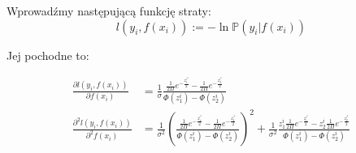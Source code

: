 \documentclass[12pt,a4paper]{article}
\begin{document}
Wprowadźmy następującą funkcję straty:
$$
\textit{l}(y_i, f(x_i)) := -\ln\mathbb{P}(y_i| f(x_i))
$$

Jej pochodne to:

\begin{align*}
\frac{\partial\textit{l}(y_i, f(x_i))}{\partial f(x_i)} 
&= \frac{1}{\sigma}\frac{\frac{1}{2\Pi}e^{-\frac{z_1^{i^2}}{2}}-\frac{1}{2\Pi}e^{-\frac{z_2^{i^2}}{2}}}{\Phi\left( z_1^i \right) - \Phi\left( z_2^i \right)}\\
\frac{\partial^2\textit{l}(y_i, f(x_i))}{\partial^2 f(x_i)} 
&= \frac{1}{\sigma^2}\left( \frac{\frac{1}{2\Pi}e^{-\frac{z_1^{i^2}}{2}}-\frac{1}{2\Pi}e^{-\frac{z_2^{i^2}}{2}}}{\Phi\left( z_1^i \right) - \Phi\left( z_2^i \right)} \right)^2 + \frac{1}{\sigma^2}\frac{z_1^i\frac{1}{2\Pi}e^{-\frac{z_1^{i^2}}{2}}-z_2^i\frac{1}{2\Pi}e^{-\frac{z_2^{i^2}}{2}}}{\Phi\left( z_1^i \right) - \Phi\left( z_2^i \right)}
\end{align*}
\end{document}
